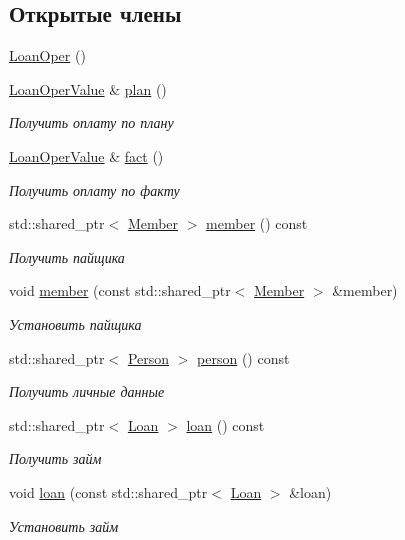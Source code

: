 \subsection*{Открытые члены}
\begin{DoxyCompactItemize}
\item 
\hyperlink{classkpk_1_1data_1_1_loan_oper_ab4c52cd423192f6d8a14bac56917e8cb}{Loan\+Oper} ()
\item 
\hyperlink{classkpk_1_1data_1_1_loan_oper_value}{Loan\+Oper\+Value} \& \hyperlink{classkpk_1_1data_1_1_loan_oper_af20e426695913f8593131a65014b29b4}{plan} ()
\begin{DoxyCompactList}\small\item\em Получить оплату по плану \end{DoxyCompactList}\item 
\hyperlink{classkpk_1_1data_1_1_loan_oper_value}{Loan\+Oper\+Value} \& \hyperlink{classkpk_1_1data_1_1_loan_oper_afab5ad2be6f0207bce3c61e2b6ea8f40}{fact} ()
\begin{DoxyCompactList}\small\item\em Получить оплату по факту \end{DoxyCompactList}\item 
std\+::shared\+\_\+ptr$<$ \hyperlink{classkpk_1_1data_1_1_member}{Member} $>$ \hyperlink{classkpk_1_1data_1_1_loan_oper_a18b2bace5fa76d8fe05e275edd88b604}{member} () const 
\begin{DoxyCompactList}\small\item\em Получить пайщика \end{DoxyCompactList}\item 
void \hyperlink{classkpk_1_1data_1_1_loan_oper_af5ac012ec26a5380d0df9ed2f263c8cd}{member} (const std\+::shared\+\_\+ptr$<$ \hyperlink{classkpk_1_1data_1_1_member}{Member} $>$ \&member)
\begin{DoxyCompactList}\small\item\em Установить пайщика \end{DoxyCompactList}\item 
std\+::shared\+\_\+ptr$<$ \hyperlink{classkpk_1_1data_1_1_person}{Person} $>$ \hyperlink{classkpk_1_1data_1_1_loan_oper_a20f5a2088eb043664cc127bcf2f1fe37}{person} () const 
\begin{DoxyCompactList}\small\item\em Получить личные данные \end{DoxyCompactList}\item 
std\+::shared\+\_\+ptr$<$ \hyperlink{classkpk_1_1data_1_1_loan}{Loan} $>$ \hyperlink{classkpk_1_1data_1_1_loan_oper_a112db60dae0b1e3f2e40c8c3a2444848}{loan} () const 
\begin{DoxyCompactList}\small\item\em Получить займ \end{DoxyCompactList}\item 
void \hyperlink{classkpk_1_1data_1_1_loan_oper_af46beb664e0021f8939e70de3c89ab50}{loan} (const std\+::shared\+\_\+ptr$<$ \hyperlink{classkpk_1_1data_1_1_loan}{Loan} $>$ \&loan)
\begin{DoxyCompactList}\small\item\em Установить займ \end{DoxyCompactList}\end{DoxyCompactItemize}
